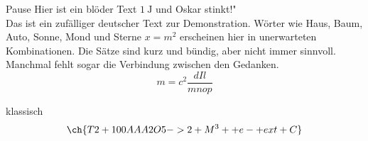 \documentclass{article}
\begin{document}
Pause Hier ist ein blöder Text $\SI{1}{\joule}$ und Oskar stinkt!"\\
Das ist ein zufälliger deutscher Text zur Demonstration. Wörter wie Haus, Baum, Auto, Sonne, Mond und Sterne  $x=m^2$
erscheinen hier in unerwarteten Kombinationen. Die 
Sätze sind kurz und bündig, aber nicht immer sinnvoll. 
Manchmal fehlt sogar die Verbindung zwischen den Gedanken.
$$m=c^2\frac{dIl}{mnop}$$

klassisch $$\ch{T2 + 100 AAA2O5 -> 2 + M^3+ + e- + ext + C}$$
\end{document}
